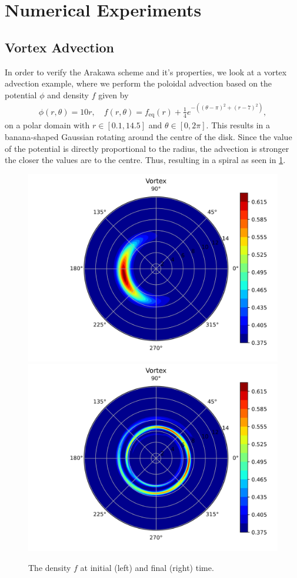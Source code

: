 

\section{Numerical Experiments}
\label{sec:num_exp}


\subsection{Vortex Advection}

In order to verify the Arakawa scheme and it's properties, we look at a vortex advection example, where we perform the poloidal advection based on the potential $\phi$ and density $f$ given by 
\begin{align}
	\phi(r, \theta)  = 10 r, \quad f(r, \theta) = f_\text{eq}(r) + \frac14 e^{- ((\theta-\pi)^2 + (r -7)^2)},
\end{align}  
on a polar domain with $r \in [0.1, 14.5]$ and $\theta \in [0, 2\pi]$. This results in a banana-shaped Gaussian rotating around the centre of the disk. Since the value of the potential is directly proportional to the radius, the advection is stronger the closer the values are to the centre. Thus, resulting in a spiral as seen in \ref{fig:vortex}.

\begin{figure}[h]
	\centering
	\includegraphics[width=0.45\linewidth]{plots/vortex_init.png}
	\includegraphics[width=0.45\linewidth]{plots/vortex_final.png}
	\caption{The density $f$ at initial (left) and final (right) time.}
	\label{fig:vortex}
\end{figure}

